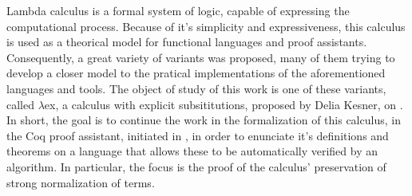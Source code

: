 Lambda calculus is a formal system of logic, capable of expressing the computational process.
Because of it's simplicity and expressiveness, this calculus is used as a theorical model
for functional languages and proof assistants. Consequently, a great variety of variants
was proposed, many of them trying to develop a closer model to the pratical implementations
of the aforementioned languages and tools.
The object of study of this work is one of these variants, called $\lambda$ex, 
a calculus with explicit subsititutions, proposed by Delia Kesner, on \cite{delia}.
In short, the goal is to continue the work in the formalization of this calculus, 
in the Coq proof assistant, initiated in \cite{initial}, in order to
enunciate it's definitions and theorems on a language that allows these to be automatically
verified by an algorithm.
In particular, the focus is the proof of the calculus' preservation of strong normalization of terms.
